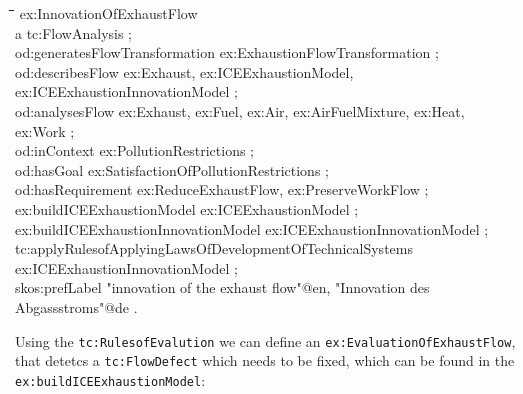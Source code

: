 \documentclass[a4paper,11pt]{article}
\newenvironment{code}{\tt \begin{tabbing}
\hskip12pt\=\hskip12pt\=\hskip12pt\=\hskip12pt\=\hskip5cm\=\hskip5cm\=\kill}
{\end{tabbing}}
\begin{document}
    \begin{code}
    ex:InnovationOfExhaustFlow \\
    \> a tc:FlowAnalysis ; \\
    \> od:generatesFlowTransformation ex:ExhaustionFlowTransformation ; \\
    \> od:describesFlow ex:Exhaust, ex:ICEExhaustionModel,  \\
    \> ex:ICEExhaustionInnovationModel ; \\
    \> od:analysesFlow ex:Exhaust, ex:Fuel, ex:Air, ex:AirFuelMixture, ex:Heat, \\
    \> ex:Work ; \\
    \> od:inContext ex:PollutionRestrictions ; \\
    \> od:hasGoal ex:SatisfactionOfPollutionRestrictions ; \\
    \> od:hasRequirement ex:ReduceExhaustFlow, ex:PreserveWorkFlow ; \\
    \> ex:buildICEExhaustionModel ex:ICEExhaustionModel ; \\
    \> ex:buildICEExhaustionInnovationModel ex:ICEExhaustionInnovationModel ; \\
    \> tc:applyRulesofApplyingLawsOfDevelopmentOfTechnicalSystems  \\
    \> ex:ICEExhaustionInnovationModel ; \\
    \> skos:prefLabel "innovation of the exhaust flow"@en, "Innovation des  \\
    \> Abgassstroms"@de . \\
    \end{code}

    Using the \texttt{tc:RulesofEvalution} we can define an 
    \texttt{ex:EvaluationOfExhaustFlow}, that detetcs a 
    \texttt{tc:FlowDefect} which needs to be fixed, which can be found in the 
    \newline
    \texttt{ex:buildICEExhaustionModel}:
\end{document}
